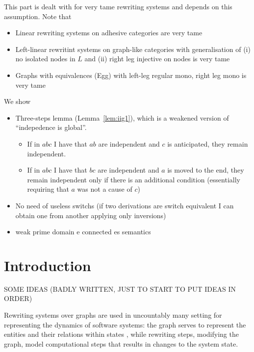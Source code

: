 \documentclass[a4paper,UKenglish,cleveref,pdftex, thm-restate,numberwithinsect]{lipics}
\begin{document}
This part is dealt with for very tame rewriting systems and depends on this assumption. Note that
\begin{itemize}
\item Linear rewriting systems on adhesive categories are very tame
\item Left-linear rewritint systems on graph-like categories with generalisation of (i) no isolated nodes in $L$ and (ii) right leg injective on nodes is very tame
\item Graphs with equivalences (Egg) with left-leg regular mono, right leg mono is very tame
\end{itemize}

We show
\begin{itemize}

  
\item Three-steps lemma (Lemma~\ref{lem:iig1}), which is a weakened version of ``indepedence is global''.
  \begin{itemize}
    
  \item If in $abc$ I have that $ab$ are independent and $c$ is anticipated, they remain independent.
  \item  If in $abc$ I have that $bc$ are independent and $a$ is moved to the end, they remain independent only if there is an additional condition (essentially requiring that $a$ was not a cause of $c$)
  \end{itemize}

  
  
\item No need of useless switchs (if two derivations are switch equivalent I can obtain one from another applying only inversions)

\item weak prime domain e connected es semantics
\end{itemize}


\section{Introduction}


SOME IDEAS (BADLY WRITTEN, JUST TO START TO PUT IDEAS IN ORDER)

Rewriting systems over graphs are used in uncountably many setting for
representing the dynamics of software systems: the graph serves to represent
the entities and their relations within states , while rewriting steps,
modifying the graph, model computational steps that results in
changes to the system state.
\end{document}
